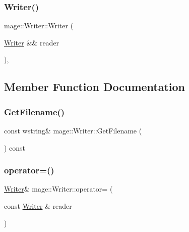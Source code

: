 \hypertarget{classmage_1_1_writer_a241e8a12f0dba91b437de40639eda325}{}\label{classmage_1_1_writer_a241e8a12f0dba91b437de40639eda325} 
\subsubsection{\texorpdfstring{Writer()}{Writer()}\hspace{0.1cm}{\footnotesize\ttfamily [3/3]}}
{\footnotesize\ttfamily mage\+::\+Writer\+::\+Writer (\begin{DoxyParamCaption}\item[{\hyperlink{classmage_1_1_writer}{Writer} \&\&}]{reader }\end{DoxyParamCaption})\hspace{0.3cm}{\ttfamily [protected]}, {\ttfamily [default]}}



\subsection{Member Function Documentation}
\hypertarget{classmage_1_1_writer_aa874f2ee6cdd6663078d213f10d984f1}{}\label{classmage_1_1_writer_aa874f2ee6cdd6663078d213f10d984f1} 
\subsubsection{\texorpdfstring{Get\+Filename()}{GetFilename()}}
{\footnotesize\ttfamily const wstring\& mage\+::\+Writer\+::\+Get\+Filename (\begin{DoxyParamCaption}{ }\end{DoxyParamCaption}) const}

\hypertarget{classmage_1_1_writer_a14fff6d050ad263bd351b26b86ca4186}{}\label{classmage_1_1_writer_a14fff6d050ad263bd351b26b86ca4186} 
\subsubsection{\texorpdfstring{operator=()}{operator=()}\hspace{0.1cm}{\footnotesize\ttfamily [1/2]}}
{\footnotesize\ttfamily \hyperlink{classmage_1_1_writer}{Writer}\& mage\+::\+Writer\+::operator= (\begin{DoxyParamCaption}\item[{const \hyperlink{classmage_1_1_writer}{Writer} \&}]{reader }\end{DoxyParamCaption})\hspace{0.3cm}{\ttfamily [delete]}}

